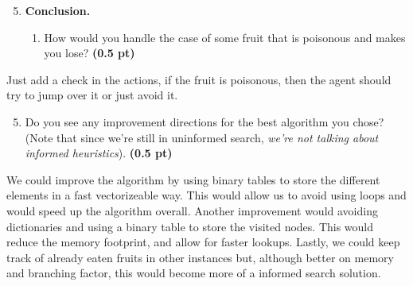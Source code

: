 \documentclass[11pt,a4paper]{../template/report}
\begin{document}
\begin{enumerate}
\setcounter{enumi}{4}
\item \textbf{Conclusion.}
\begin{enumerate}
        \item How would you handle the case of some fruit that is poisonous and makes
you lose?
\textbf{(0.5 pt)}
\end{enumerate}

\end{enumerate}

\begin{answer}
Just add a check in the actions, if the fruit is poisonous, then the agent should try to jump over it or just avoid it.
\end{answer}

\begin{enumerate}
\setcounter{enumi}{4}
\begin{enumerate}
\setcounter{enumii}{4}
        \item  Do you see any improvement directions for the best algorithm you chose? (Note that since we're still in uninformed search, \textit{we're not talking about informed heuristics}). \textbf{(0.5 pt)}
\end{enumerate}

\end{enumerate}

\begin{answer}
We could improve the algorithm by using binary tables to store the different elements in a fast vectorizeable way. This would allow us to avoid using loops and would speed up the algorithm overall. 
Another improvement would avoiding dictionaries and using a binary table to store the visited nodes. This would reduce the memory footprint, and allow for faster lookups.
Lastly, we could keep track of already eaten fruits in other instances but, although better on memory and branching factor, this would become more of a informed search solution.
\end{answer}
\end{document}
